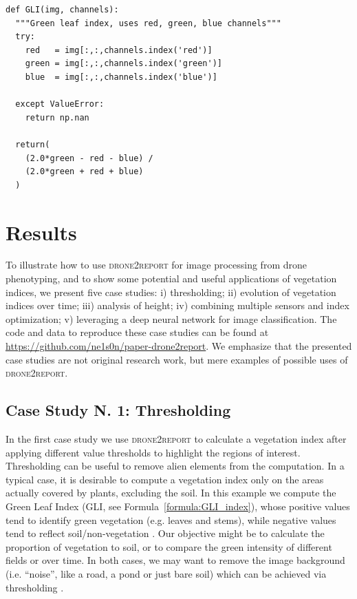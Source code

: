 \documentclass[drones,technicalnote,accept,pdftex,moreauthors]{Definitions/mdpi}
\begin{document}
\begin{minipage}{\hsize}%
\lstset{frame=single,framexleftmargin=-1pt,framexrightmargin=-17pt,framesep=12pt,linewidth=0.98\textwidth,language=python}%

\begin{lstlisting}[caption={Example of function computing the GLI vegetation index on a passed image},label={lst:GLI_function}]
def GLI(img, channels):
  """Green leaf index, uses red, green, blue channels"""
  try:
    red   = img[:,:,channels.index('red')]
    green = img[:,:,channels.index('green')]
    blue  = img[:,:,channels.index('blue')]
   
  except ValueError:
    return np.nan
    
  return(
    (2.0*green - red - blue) / 
    (2.0*green + red + blue)
  ) 
\end{lstlisting}
\end{minipage}


\section{Results}
\label{results}

To illustrate how to use \textsc{drone2report} for image processing from drone phenotyping, and to show some potential and useful applications of vegetation indices, we present five case studies: i) thresholding; ii) evolution of vegetation indices over time; iii) analysis of height; iv) combining multiple sensors and index optimization; v) leveraging a deep neural network for image classification. 
The code and data to reproduce these case studies can be found at \url{https://github.com/ne1s0n/paper-drone2report}.
We emphasize that the presented case studies are not original research work, but mere examples of possible uses of \textsc{drone2report}.

\subsection{Case Study N. 1: Thresholding}

In the first case study we use \textsc{drone2report} to calculate a vegetation index after applying different value thresholds to highlight the regions of interest. Thresholding can be useful to remove alien elements from the computation. In a typical case, it is desirable to compute a vegetation index only on the areas actually covered by plants, excluding the soil.
In this example we compute the Green Leaf Index (GLI, see Formula~\ref{formula:GLI_index}), whose positive values tend to identify green vegetation (e.g. leaves and stems), while negative values tend to reflect soil/non-vegetation \cite{louhaichi2001spatially}. 
Our objective might be to calculate the proportion of vegetation to soil, or to compare the green intensity of different fields or over time. In both cases, we may want to remove the image background (i.e. ``noise'', like a road, a pond or just bare soil) which can be achieved via thresholding \cite{hamuda2016survey}.
\end{document}
